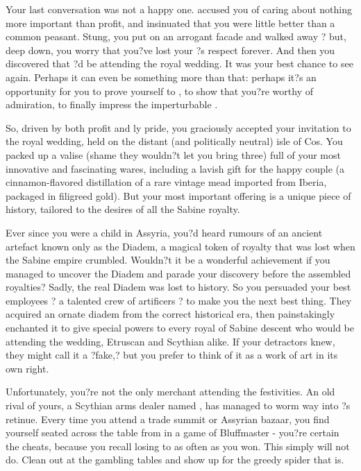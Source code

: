 \documentclass[char]{Kos}
\begin{document}
Your last conversation was not a happy one. \cAnarchist{\They} accused you of caring about nothing more important than profit, and insinuated that you were little better than a common peasant. Stung, you put on an arrogant facade and walked away ? but, deep down, you worry that you?ve lost your \cAnarchist{\sibling}?s respect forever. And then you discovered that \cAnarchist{\they}?d be attending the royal wedding. It was your best chance to see \cAnarchist{\them} again. Perhaps it can even be something more than that: perhaps it?s an opportunity for you to prove yourself to \cAnarchist{\them}, to show \cAnarchist{\them} that you?re worthy of \cAnarchist{\their} admiration, to finally impress the imperturbable \cAnarchist{}.

So, driven by both profit and \cMerchant{\sibling}ly pride, you graciously accepted your invitation to the royal wedding, held on the distant (and politically neutral) isle of Cos. You packed up a valise (shame they wouldn?t let you bring three) full of your most innovative and fascinating wares, including a lavish gift for the happy couple (a cinnamon-flavored distillation of a rare vintage mead imported from Iberia, packaged in filigreed gold). But your most important offering is a unique piece of history, tailored to the desires of all the Sabine royalty. 

Ever since you were a child in Assyria, you?d heard rumours of an ancient artefact known only as the Diadem, a magical token of royalty that was lost when the Sabine empire crumbled. Wouldn?t it be a wonderful achievement if you managed to uncover the Diadem and parade your discovery before the assembled royalties? Sadly, the real Diadem was lost to history. So you persuaded your best employees ? a talented crew of artificers ? to make you the next best thing. They acquired an ornate diadem from the correct historical era, then painstakingly enchanted it to give special powers to every royal of Sabine descent who would be attending the wedding, Etruscan and Scythian alike. If your detractors knew, they might call it a ?fake,? but you prefer to think of it as a work of art in its own right.

Unfortunately, you?re not the only merchant attending the festivities. An old rival of yours, a Scythian arms dealer named \cArmsDealer{}, has managed to worm \cArmsDealer{\their} way into \cScythiaKing{\Monarch} \cScythiaKing{}?s retinue. Every time you attend a trade summit or Assyrian bazaar, you find yourself seated across the table from \cArmsDealer{\them} in a game of Bluffmaster - you?re certain the \cArmsDealer{\human} cheats, because you recall losing to \cArmsDealer{\them} as often as you won. This simply will not do. Clean \cArmsDealer{} out at the gambling tables and show \cArmsDealer{\them} up for the greedy spider that \cArmsDealer{\they} is. 
\end{document}
